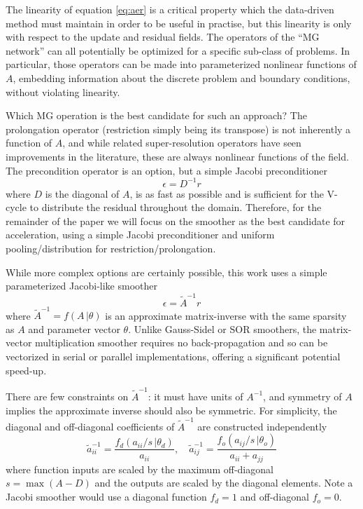 \documentclass[review]{elsarticle}
\begin{document}
The linearity of equation \ref{eq:aer} is a critical property which the data-driven method must maintain in order to be useful in practise, but this linearity is only with respect to the update and residual fields. The operators of the ``MG network'' can all potentially be optimized for a specific sub-class of problems. In particular, those operators can be made into parameterized nonlinear functions of $A$, embedding information about the discrete problem and boundary conditions, without violating linearity. 

Which MG operation is the best candidate for such an approach? The prolongation operator (restriction simply being its transpose) is not inherently a function of $A$, and while related super-resolution operators have seen improvements in the literature, these are always nonlinear functions of the field. The precondition operator is an option, but a simple Jacobi preconditioner
\begin{equation}
    \epsilon = D^{-1}r
\end{equation}
where $D$ is the diagonal of $A$, is as fast as possible and is sufficient for the V-cycle to distribute the residual throughout the domain. Therefore, for the remainder of the paper we will focus on the smoother as the best candidate for acceleration, using a simple Jacobi preconditioner and uniform pooling/distribution for restriction/prolongation.

While more complex options are certainly possible, this work uses a simple parameterized Jacobi-like smoother
\begin{equation}
    \epsilon = \tilde A^{-1}r
\end{equation}
where $\tilde A^{-1}=f(A\,|\theta)$ is an approximate matrix-inverse with the same sparsity as $A$ and parameter vector $\theta$. 
Unlike Gauss-Sidel or SOR smoothers, the matrix-vector multiplication smoother requires no back-propagation and so can be vectorized in serial or parallel implementations, offering a significant potential speed-up.

There are few constraints on $\tilde A^{-1}$: it must have units of $A^{-1}$, and symmetry of $A$ implies the approximate inverse should also be symmetric. For simplicity, the diagonal and off-diagonal coefficients of $\tilde A^{-1}$ are constructed independently 
\begin{equation}
    \tilde a^{-1}_{ii} = \frac{f_d(a_{ii}/s\,|\theta_d)}{a_{ii}} , \quad
    \tilde a^{-1}_{ij} = \frac{f_o(a_{ij}/s\,|\theta_o)}{a_{ii}+a_{jj}}
\end{equation}
where function inputs are scaled by the maximum off-diagonal $s=\max(A-D)$ and the outputs are scaled by the diagonal elements. Note a Jacobi smoother would use a diagonal function $f_d=1$ and off-diagonal $f_o=0$. 
\end{document}
